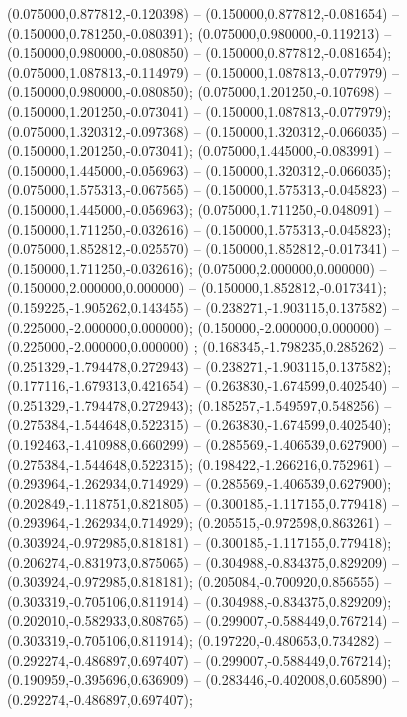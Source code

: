  (0.075000,0.877812,-0.120398) -- (0.150000,0.877812,-0.081654) -- (0.150000,0.781250,-0.080391);
 (0.075000,0.980000,-0.119213) -- (0.150000,0.980000,-0.080850) -- (0.150000,0.877812,-0.081654);
 (0.075000,1.087813,-0.114979) -- (0.150000,1.087813,-0.077979) -- (0.150000,0.980000,-0.080850);
 (0.075000,1.201250,-0.107698) -- (0.150000,1.201250,-0.073041) -- (0.150000,1.087813,-0.077979);
 (0.075000,1.320312,-0.097368) -- (0.150000,1.320312,-0.066035) -- (0.150000,1.201250,-0.073041);
 (0.075000,1.445000,-0.083991) -- (0.150000,1.445000,-0.056963) -- (0.150000,1.320312,-0.066035);
 (0.075000,1.575313,-0.067565) -- (0.150000,1.575313,-0.045823) -- (0.150000,1.445000,-0.056963);
 (0.075000,1.711250,-0.048091) -- (0.150000,1.711250,-0.032616) -- (0.150000,1.575313,-0.045823);
 (0.075000,1.852812,-0.025570) -- (0.150000,1.852812,-0.017341) -- (0.150000,1.711250,-0.032616);
 (0.075000,2.000000,0.000000) -- (0.150000,2.000000,0.000000) -- (0.150000,1.852812,-0.017341);
 (0.159225,-1.905262,0.143455) -- (0.238271,-1.903115,0.137582) -- (0.225000,-2.000000,0.000000);
 (0.150000,-2.000000,0.000000) -- (0.225000,-2.000000,0.000000) ;
 (0.168345,-1.798235,0.285262) -- (0.251329,-1.794478,0.272943) -- (0.238271,-1.903115,0.137582);
 (0.177116,-1.679313,0.421654) -- (0.263830,-1.674599,0.402540) -- (0.251329,-1.794478,0.272943);
 (0.185257,-1.549597,0.548256) -- (0.275384,-1.544648,0.522315) -- (0.263830,-1.674599,0.402540);
 (0.192463,-1.410988,0.660299) -- (0.285569,-1.406539,0.627900) -- (0.275384,-1.544648,0.522315);
 (0.198422,-1.266216,0.752961) -- (0.293964,-1.262934,0.714929) -- (0.285569,-1.406539,0.627900);
 (0.202849,-1.118751,0.821805) -- (0.300185,-1.117155,0.779418) -- (0.293964,-1.262934,0.714929);
 (0.205515,-0.972598,0.863261) -- (0.303924,-0.972985,0.818181) -- (0.300185,-1.117155,0.779418);
 (0.206274,-0.831973,0.875065) -- (0.304988,-0.834375,0.829209) -- (0.303924,-0.972985,0.818181);
 (0.205084,-0.700920,0.856555) -- (0.303319,-0.705106,0.811914) -- (0.304988,-0.834375,0.829209);
 (0.202010,-0.582933,0.808765) -- (0.299007,-0.588449,0.767214) -- (0.303319,-0.705106,0.811914);
 (0.197220,-0.480653,0.734282) -- (0.292274,-0.486897,0.697407) -- (0.299007,-0.588449,0.767214);
 (0.190959,-0.395696,0.636909) -- (0.283446,-0.402008,0.605890) -- (0.292274,-0.486897,0.697407);
